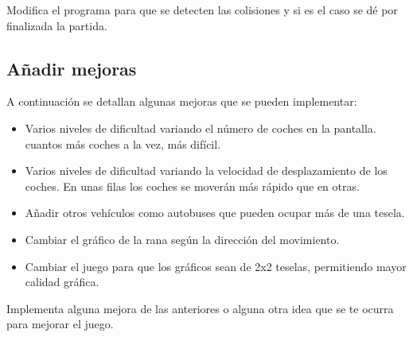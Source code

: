 \begin{exercise}
	Modifica el programa para que se detecten las colisiones y si es el caso se dé por finalizada la partida.
\end{exercise}

\subsection{Añadir mejoras}
A continuación se detallan algunas mejoras que se pueden implementar:

\begin{itemize}
	\item Varios niveles de dificultad variando el número de coches en la pantalla. cuantos más coches a la vez, más difícil.
	\item Varios niveles de dificultad variando la velocidad de desplazamiento de los coches. En unas filas los coches se moverán más rápido que en otras.
	\item Añadir otros vehículos como autobuses que pueden ocupar más de una tesela.
	\item Cambiar el gráfico de la rana según la dirección del movimiento.
	\item Cambiar el juego para que los gráficos sean de 2x2 teselas, permitiendo mayor calidad gráfica.
\end{itemize}

\begin{exercise}
	Implementa alguna mejora de las anteriores o alguna otra idea que se te ocurra para mejorar el juego.
\end{exercise}